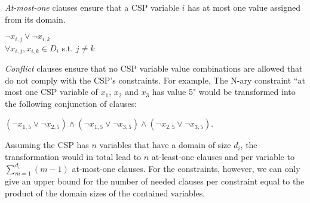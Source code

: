 \emph{At-most-one} clauses ensure that a CSP variable $i$ has at most one value assigned from its domain.
\begin{center}
    $\neg x_{i,j} \lor \neg x_{i,k}$\\
    $\forall x_{i,j}, x_{i,k} \in D_i$ s.t. $j\neq k$ 
\end{center}

\emph{Conflict} clauses ensure that no CSP variable value combinations are allowed that do not comply with the CSP's constraints.
For example, The N-ary constraint ``at most one CSP variable of $x_1$, $x_2$ and $x_3$ has value 5" would be transformed into the following conjunction of clauses:
\begin{center}
 $(\neg x_{1,5} \lor \neg x_{2,5}) \land (\neg x_{1,5} \lor \neg x_{3,5}) \land (\neg x_{2,5} \lor \neg x_{3,5})$. 
\end{center}

Assuming the CSP has $n$ variables that have a domain of size $d_i$, the transformation would in total lead to $n$ at-least-one clauses and per variable to $\sum_{m=1}^{d_i} (m-1)$ at-most-one clauses. For the constraints, however, we can only give an upper bound for the number of needed clauses per constraint equal to the product of the domain sizes of the contained variables.

